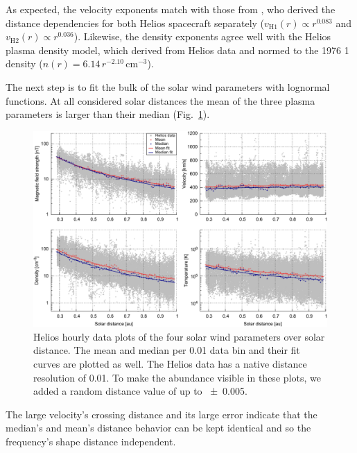 As expected, the velocity exponents match with those from \citet{Schwenn1983,Schwenn1990}, who derived the distance dependencies for both Helios spacecraft separately ($v_\text{H1}(r) \propto r^{0.083}$ and $v_\text{H2}(r) \propto r^{0.036}$).
Likewise, the density exponents agree well with the Helios plasma density model, which \citet{Bougeret1984} derived from Helios data and normed to the 1976 \SI{1}{\au} density ($n(r) = 6.14\,r^{-2.10}\,\text{cm}^{-3}$).

The next step is to fit the bulk of the solar wind parameters with lognormal functions. At all considered solar distances the mean of the three plasma parameters is larger than their median (Fig.~\ref{fig:radial_fit_4_thesis_light_skip_pdfcairo_plot}).
\begin{figure}
	\includegraphics[width=18cm]{figures/radial_fit_4_thesis_light_skip_pdfcairo_plot.pdf}
	\caption{Helios hourly data plots of the four solar wind parameters over solar distance. The mean and median per \SI{0.01}{\au} data bin and their fit curves are plotted as well. The Helios data has a native distance resolution of \SI{0.01}{\au}. To make the abundance visible in these plots, we added a random distance value of up to \SI{+-0.005}{\au}.}
	\label{fig:radial_fit_4_thesis_light_skip_pdfcairo_plot}
\end{figure}

The large velocity's crossing distance and its large error indicate that the median's and mean's distance behavior can be kept identical and so the frequency's shape distance independent.

